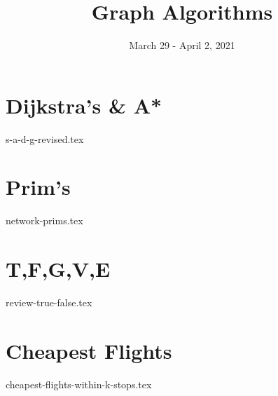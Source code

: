 \documentclass[11pt]{exam}
\title{Graph Algorithms}
\date{March 29 - April 2, 2021}
\begin{document}
\maketitle

\section{Dijkstra's \& A*}
\begin{questions}
{s-a-d-g-revised.tex}
\end{questions}

\pagebreak
\section{Prim's}
\begin{questions}
{network-prims.tex}
\end{questions}

\vspace{25mm}

\section{T,F,G,V,E}
\begin{questions}
{review-true-false.tex}
\end{questions}




\pagebreak
\section{Cheapest Flights}
\begin{questions}
{cheapest-flights-within-k-stops.tex}
\end{questions}


\end{document}
